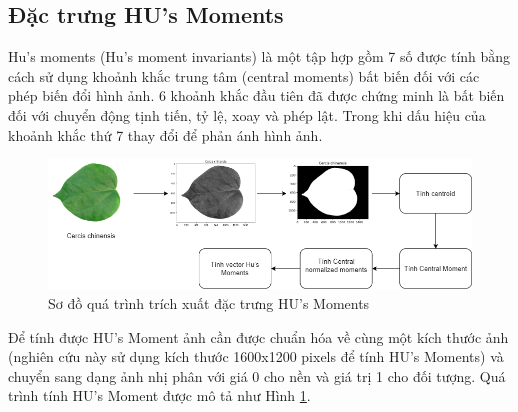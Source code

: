 \documentclass[a4paper]{article}
\begin{document}
\subsection{Đặc trưng HU's Moments}
Hu’s moments (Hu’s moment invariants) là một tập hợp gồm 7 số được tính bằng cách sử dụng khoảnh khắc trung tâm (central moments) bất biến đối với các phép biến đổi hình ảnh. 6 khoảnh khắc đầu tiên đã được chứng minh là bất biến đối với chuyển động tịnh tiến, tỷ lệ, xoay và phép lật. Trong khi dấu hiệu của khoảnh khắc thứ 7 thay đổi để phản ánh hình ảnh.
\begin{figure}
    \centering
    \includegraphics[width=1\linewidth]{images/sodohu.png}
    \caption{Sơ đồ quá trình trích xuất đặc trưng HU's Moments}
    \label{fig:sodohu}
\end{figure}
Để tính được HU's Moment ảnh cần được chuẩn hóa về cùng một kích thước ảnh (nghiên cứu này sử dụng kích thước 1600x1200 pixels để tính HU's Moments) và chuyển sang dạng ảnh nhị phân với giá 0 cho nền và giá trị 1 cho đối tượng. Quá trình tính HU's Moment được mô tả như Hình \ref{fig:sodohu}.
\end{document}
